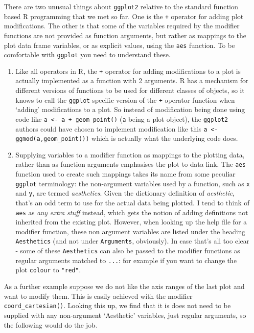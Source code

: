 \documentclass[10pt] {article}
\theoremstyle{definition}
\begin{document}
There are two unusual things about {\tt ggplot2} relative to the standard function based R programming that we met so far. One is the \verb^+^ operator for adding plot modifications. The other is that some of the variables required by the modifier functions are not provided as function arguments, but rather as mappings to the plot data frame variables, or as explicit values, using the {\tt aes} function. To be comfortable with {\tt ggplot} you need to understand these.
\begin{enumerate}
\item Like all operators in R, the \verb^+^ operator for adding modifications to a plot is actually implemented as a function with 2 arguments. R has a mechanism for different versions of functions to be used for different classes of objects, so it knows to call the {\tt ggplot} specific version of the {\tt +} operator function when `adding' modifications to a plot. So instead of modification being done using code like \lstinline^a <- a + geom_point()^ ({\tt a} being a plot object), the {\tt ggplot2} authors could have chosen to implement modification like this \lstinline+a <- ggmod(a,geom_point())+ which is actually what the underlying code does. 
\item Supplying variables to a modifier function as mappings to the plotting data, rather than as function arguments emphasises the plot to data link. The {\tt aes} function used to create such mappings takes its name from some peculiar {\tt ggplot} terminology: the non-argument variables used by a function, such as {\tt x} and {\tt y}, are termed {\em aesthetics}. Given the dictionary definition of {\em aesthetic}, that's an odd term to use for the actual data being plotted. I tend to think of {\tt aes} as {\em any extra stuff} instead, which gets the notion of adding definitions not inherited from the existing plot. However, when looking up the help file for a modifier function, these non argument variables are listed under the heading {\tt Aesthetics} (and not under {\tt Arguments}, obviously). In case that's all too clear - some of these {\tt Aesthetics} can also be passed to the modifier functions as regular arguments matched to \lstinline+...+: for example if you want to change the plot {\tt colour} to \lstinline+"red"+.  
\end{enumerate}
As a further example suppose we do not like the axis ranges of the last plot and want to modify them. This is easily achieved with the modifier \lstinline+coord_cartesian()+. Looking this up, we find that it is does not need to be supplied with any non-argument `Aesthetic' variables, just regular arguments, so the following would do the job.
\end{document}
